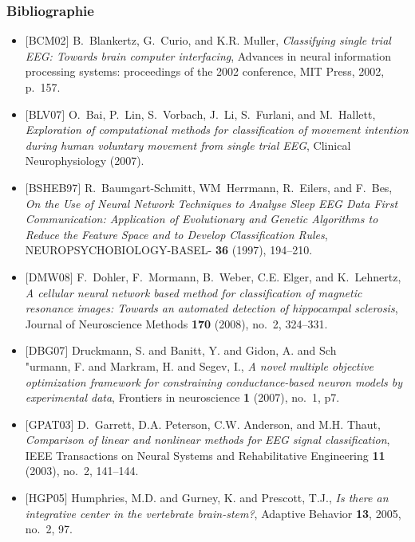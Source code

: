 \documentclass{beamer}
\begin{document}
\begin{frame}[allowframebreaks]
\frametitle{Bibliographie}
\begin{itemize}
    \item $[$BCM02$]$
    B.~Blankertz, G.~Curio, and K.R. Muller, \emph{{Classifying single trial
      EEG: Towards brain computer interfacing}}, Advances in neural information
      processing systems: proceedings of the 2002 conference, MIT Press, 2002,
      p.~157.

    \item $[$BLV07$]$
    O.~Bai, P.~Lin, S.~Vorbach, J.~Li, S.~Furlani, and M.~Hallett,
      \emph{{Exploration of computational methods for classification of movement
      intention during human voluntary movement from single trial EEG}}, Clinical
      Neurophysiology (2007).

    \item $[$BSHEB97$]$
    R.~Baumgart-Schmitt, WM~Herrmann, R.~Eilers, and F.~Bes, \emph{{On the Use of
      Neural Network Techniques to Analyse Sleep EEG Data First Communication:
      Application of Evolutionary and Genetic Algorithms to Reduce the Feature
      Space and to Develop Classification Rules}}, NEUROPSYCHOBIOLOGY-BASEL-
      \textbf{36} (1997), 194--210.

    \item $[$DMW08$]$
    F.~Dohler, F.~Mormann, B.~Weber, C.E. Elger, and K.~Lehnertz, \emph{{A
      cellular neural network based method for classification of magnetic resonance
      images: Towards an automated detection of hippocampal sclerosis}}, Journal of
      Neuroscience Methods \textbf{170} (2008), no.~2, 324--331.

    \item $[$DBG07$]$
    Druckmann, S. and Banitt, Y. and Gidon, A. and Sch{\\"u}rmann, F. and Markram, H. and Segev, I.,
      \emph{{A novel multiple objective optimization framework for constraining conductance-based neuron models by experimental data}},
      Frontiers in neuroscience \textbf{1} (2007), no.~1, p7.

    \item $[$GPAT03$]$
    D.~Garrett, D.A. Peterson, C.W. Anderson, and M.H. Thaut, \emph{{Comparison of
      linear and nonlinear methods for EEG signal classification}}, IEEE
      Transactions on Neural Systems and Rehabilitative Engineering \textbf{11}
      (2003), no.~2, 141--144.

    \item $[$HGP05$]$
    Humphries, M.D. and Gurney, K. and Prescott, T.J., \emph{{Is there an integrative center in the vertebrate brain-stem?}},
      Adaptive Behavior \textbf{13}, 2005, no.~2, 97.


\end{itemize}
\end{frame}
\end{document}
